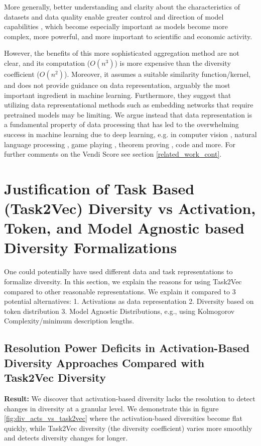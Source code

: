 \documentclass[10pt]{article} %
\begin{document}
More generally, better understanding and clarity about the characteristics of datasets and data quality enable greater control and direction of model capabilities \citep{mitchell2023measuring}, which become especially important as models become more complex, more powerful, and more important to scientific and economic activity. 

However, the benefits of this more sophisticated aggregation method are not clear, and its computation ($O(n^3)$) is more expensive than the diversity coefficient ($O(n^2)$). 
Moreover, it assumes a suitable similarity function/kernel, and does not provide guidance on data representation, arguably the most important ingredient in machine learning. 
Furthermore, they suggest that utilizing data representational methods such as embedding networks that require pretrained models may be limiting.
We argue instead that data representation is a fundamental property of data processing that has led to the overwhelming success in machine learning due to deep learning, e.g. in computer vision \citep{alexnet, resnet}, natural language processing \citep{bert, gpt3, chowdhery2022palm, gpt4, google2023palm2}, game playing \citep{alphago, atari1, EfficientZero}, theorem proving \citep{skiptree, gptf, pact}, code \citep{codex} and more.
For further comments on the Vendi Score see section \ref{related_work_cont}.

\section{Justification of Task Based (Task2Vec) Diversity vs Activation, Token, and Model Agnostic based Diversity Formalizations}
One could potentially have used different data and task representations to formalize diversity.
In this section, we explain the reasons for using Task2Vec compared to other reasonable representations. 
We explain it compared to 3 potential alternatives: 
1. Activations as data representation
2. Diversity based on token distribution
3. Model Agnostic Distributions, e.g., using Kolmogorov Complexity/minimum description lengths.

\subsection{Resolution Power Deficits in Activation-Based Diversity Approaches Compared with Task2Vec Diversity}\label{subsection:div_acts_vs_task2vec}
\textbf{Result:} 
We discover that activation-based diversity lacks the resolution to detect changes in diversity at a granular level.
We demonstrate this in figure \ref{fig:div_acts_vs_task2vec} where the activation-based diversities become flat quickly, while Task2Vec diversity (the diversity coefficient) varies more smoothly and detects diversity changes for longer. 
\end{document}
